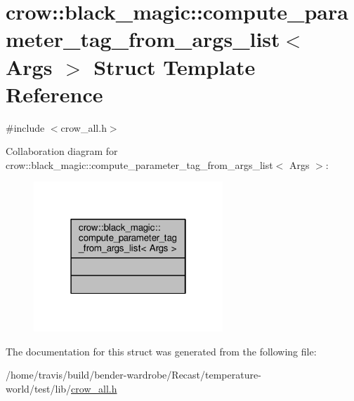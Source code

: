 \hypertarget{structcrow_1_1black__magic_1_1compute__parameter__tag__from__args__list}{\section{crow\-:\-:black\-\_\-magic\-:\-:compute\-\_\-parameter\-\_\-tag\-\_\-from\-\_\-args\-\_\-list$<$ Args $>$ Struct Template Reference}
\label{structcrow_1_1black__magic_1_1compute__parameter__tag__from__args__list}
}


{\ttfamily \#include $<$crow\-\_\-all.\-h$>$}



Collaboration diagram for crow\-:\-:black\-\_\-magic\-:\-:compute\-\_\-parameter\-\_\-tag\-\_\-from\-\_\-args\-\_\-list$<$ Args $>$\-:
\nopagebreak
\begin{figure}[H]
\begin{center}
\leavevmode
\includegraphics[width=202pt]{structcrow_1_1black__magic_1_1compute__parameter__tag__from__args__list__coll__graph}
\end{center}
\end{figure}


The documentation for this struct was generated from the following file\-:\begin{DoxyCompactItemize}
\item 
/home/travis/build/bender-\/wardrobe/\-Recast/temperature-\/world/test/lib/\hyperlink{crow__all_8h}{crow\-\_\-all.\-h}\end{DoxyCompactItemize}
